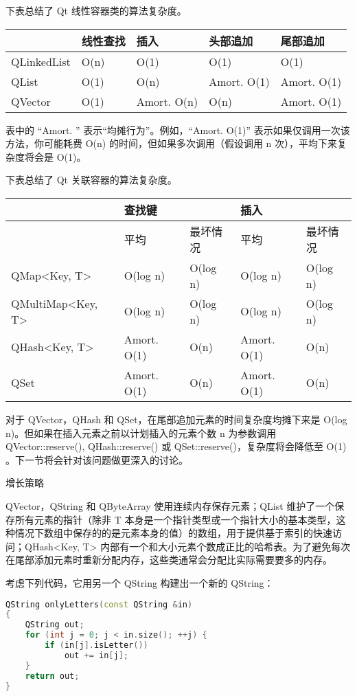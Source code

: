 下表总结了 Qt 线性容器类的算法复杂度。

\begin{tabular}{|l|l|l|l|l|}
\hline
&线性查找	&插入	&头部追加&	尾部追加\\
\hline
QLinkedList&	O(n)&	O(1)&	O(1)&	O(1)\\
\hline
QList&	O(1)&	O(n)&	Amort. O(1)	&Amort. O(1)\\
\hline
QVector&	O(1)&	Amort. O(n)&	O(n)	&Amort. O(1)\\
\hline
\end{tabular}

表中的 “Amort. ” 表示“均摊行为”。例如，“Amort. O(1)” 表示如果仅调用一次该方法，你可能耗费 O(n) 的时间，但如果多次调用（假设调用 n 次），平均下来复杂度将会是 O(1)。

下表总结了 Qt 关联容器的算法复杂度。

\begin{tabular}{|l|l|l|l|l|}
\hline
&查找键	&&	插入&	\\
\hline
&平均&	最坏情况&	平均&	最坏情况\\
\hline
QMap<Key, T>&	O(log n)&	O(log n)&	O(log n)&	O(log n)\\
\hline
QMultiMap<Key, T>&	O(log n)	&O(log n)&	O(log n)&	O(log n)\\
\hline
QHash<Key, T>&	Amort. O(1)&	O(n)&	Amort. O(1)&	O(n)\\
\hline
QSet&	Amort. O(1)&	O(n)	&Amort. O(1)	&O(n)\\
\hline
\end{tabular}

对于 QVector，QHash 和 QSet，在尾部追加元素的时间复杂度均摊下来是 O(log n)。但如果在插入元素之前以计划插入的元素个数 n 为参数调用 QVector::reserve(), QHash::reserve() 或 QSet::reserve()，复杂度将会降低至 O(1) 。下一节将会针对该问题做更深入的讨论。

\splitLine

增长策略

QVector，QString 和 QByteArray 使用连续内存保存元素；QList 维护了一个保存所有元素的指针（除非 T 本身是一个指针类型或一个指针大小的基本类型，这种情况下数组中保存的的是元素本身的值）的数组，用于提供基于索引的快速访问；QHash<Key, T> 内部有一个和大小元素个数成正比的哈希表。为了避免每次在尾部添加元素时重新分配内存，这些类通常会分配比实际需要要多的内存。

考虑下列代码，它用另一个 QString 构建出一个新的 QString：

\begin{lstlisting}[language=C++]
QString onlyLetters(const QString &in)
{
    QString out;
    for (int j = 0; j < in.size(); ++j) {
        if (in[j].isLetter())
            out += in[j];
    }
    return out;
}
\end{lstlisting}

